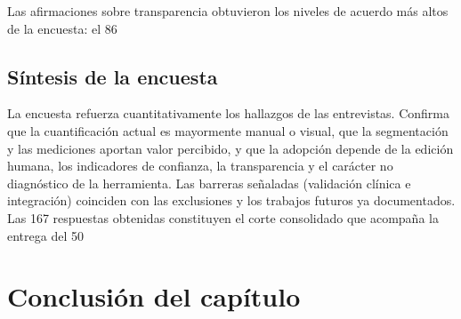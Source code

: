
Las afirmaciones sobre transparencia obtuvieron los niveles de acuerdo más altos de la encuesta: el 86 %


\subsection{Síntesis de la encuesta}

La encuesta refuerza cuantitativamente los hallazgos de las entrevistas. Confirma que la cuantificación actual es mayormente manual o visual, que la segmentación y las mediciones aportan valor percibido, y que la adopción depende de la edición humana, los indicadores de confianza, la transparencia y el carácter no diagnóstico de la herramienta. Las barreras señaladas (validación clínica e integración) coinciden con las exclusiones y los trabajos futuros ya documentados. Las 167 respuestas obtenidas constituyen el corte consolidado que acompaña la entrega del 50 %

\section{Conclusión del capítulo}

